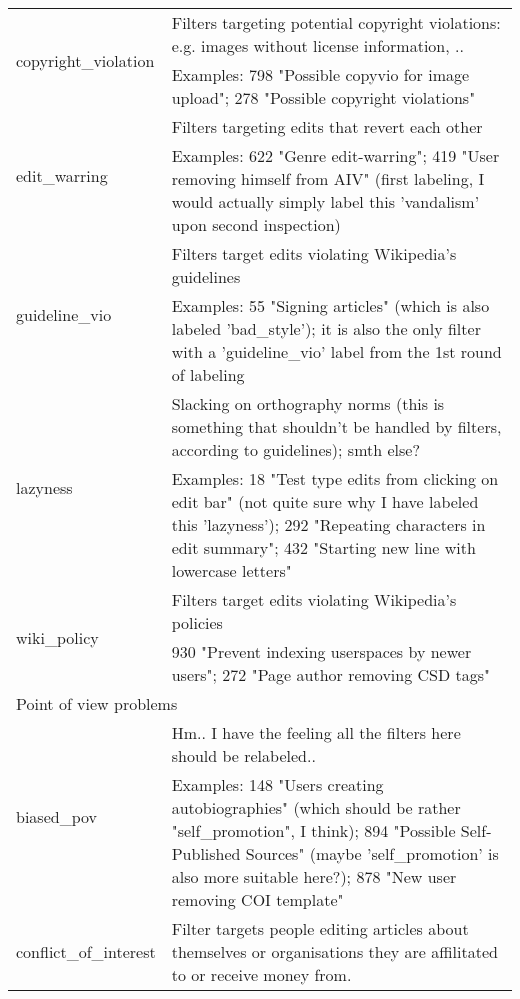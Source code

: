 \begin{longtable}{ | p{5cm} | p{9cm} | }
    \hline
    \multirow{2}{*}{copyright\_violation} & Filters targeting potential copyright violations: e.g. images without license information, ..\\
                                     & Examples: 798 "Possible copyvio for image upload"; 278 "Possible copyright violations"\\
    \hline
    \multirow{2}{*}{edit\_warring} & Filters targeting edits that revert each other \\
                                     & Examples: 622 "Genre edit-warring"; 419 "User removing himself from AIV" (first labeling, I would actually simply label this 'vandalism' upon second inspection)\\
    \hline
    \multirow{2}{*}{guideline\_vio} &  Filters target edits violating Wikipedia's guidelines \\%
                                     & Examples: 55 "Signing articles" (which is also labeled 'bad\_style'); it is also the only filter with a 'guideline\_vio' label from the 1st round of labeling\\
    \hline
    \multirow{2}{*}{lazyness} & Slacking on orthography norms (this is something that shouldn't be handled by filters, according to guidelines); smth else?\\
                                     & Examples: 18 "Test type edits from clicking on edit bar" (not quite sure why I have labeled this 'lazyness'); 292 "Repeating characters in edit summary"; 432 "Starting new line with lowercase letters"\\
    \hline
    \multirow{2}{*}{wiki\_policy} & Filters target edits violating Wikipedia's policies\\
                                     & 930 "Prevent indexing userspaces by newer users"; 272 "Page author removing CSD tags"\\
    \hline
        \multicolumn{2}{|l|}{Point of view problems} \\
    \hline
    \multirow{2}{*}{biased\_pov} & Hm.. I have the feeling all the filters here should be relabeled..\\
                                     & Examples: 148 "Users creating autobiographies" (which should be rather "self\_promotion", I think); 894 "Possible Self-Published Sources" (maybe 'self\_promotion' is also more suitable here?); 878 "New user removing COI template"\\
    \hline
    \multirow{2}{*}{conflict\_of\_interest} & Filter targets people editing articles about themselves or organisations they are affilitated to or receive money from.\\

\end{longtable}
